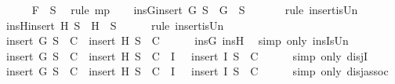 \begin{isabellebody}
\ \ \ \ \isamarkupfalse%
\ {\isacartoucheopen}F\ {\isasymin}\ {\isacharquery}S{\isacartoucheclose}\ \isamarkupfalse%
\ {\isacharparenleft}rule\ mp{\isacharparenright}\isanewline
\ \ \isamarkupfalse%
\ insG{\isacharcolon}{\isachardoublequoteopen}insert\ G\ {\isacharquery}S\ {\isacharequal}\ {\isacharbraceleft}G{\isacharbraceright}\ {\isasymunion}\ {\isacharquery}S{\isachardoublequoteclose}\ \isanewline
\ \ \ \ \isamarkupfalse%
\ {\isacharparenleft}rule\ insert{\isacharunderscore}is{\isacharunderscore}Un{\isacharparenright}\isanewline
\ \ \isamarkupfalse%
\ insH{\isacharcolon}{\isachardoublequoteopen}insert\ H\ {\isacharquery}S\ {\isacharequal}\ {\isacharbraceleft}H{\isacharbraceright}\ {\isasymunion}\ {\isacharquery}S{\isachardoublequoteclose}\isanewline
\ \ \ \ \isamarkupfalse%
\ {\isacharparenleft}rule\ insert{\isacharunderscore}is{\isacharunderscore}Un{\isacharparenright}\isanewline
\ \ \isamarkupfalse%
\ {\isachardoublequoteopen}insert\ G\ {\isacharquery}S\ {\isasymin}\ C\ {\isasymor}\ insert\ H\ {\isacharquery}S\ {\isasymin}\ C{\isachardoublequoteclose}\isanewline
\ \ \ \ \isamarkupfalse%
\ insG\ insH\ \isamarkupfalse%
\ {\isacharparenleft}simp\ only{\isacharcolon}\ insIsUn{\isacharparenright}\isanewline
\ \ \isamarkupfalse%
\ \isamarkupfalse%
\ {\isachardoublequoteopen}{\isacharparenleft}insert\ G\ {\isacharquery}S\ {\isasymin}\ C\ {\isasymor}\ insert\ H\ {\isacharquery}S\ {\isasymin}\ C{\isacharparenright}\ {\isasymor}\ {\isacharparenleft}{\isasymexists}I\ {\isasymin}\ {\isacharbraceleft}{\isacharbraceright}{\isachardot}\ insert\ I\ {\isacharquery}S\ {\isasymin}\ C{\isacharparenright}{\isachardoublequoteclose}\isanewline
\ \ \ \ \isamarkupfalse%
\ {\isacharparenleft}simp\ only{\isacharcolon}\ disjI{}{\isacharparenright}\isanewline
\ \ \isamarkupfalse%
\ \isamarkupfalse%
\ {\isachardoublequoteopen}insert\ G\ {\isacharquery}S\ {\isasymin}\ C\ {\isasymor}\ {\isacharparenleft}insert\ H\ {\isacharquery}S\ {\isasymin}\ C\ {\isasymor}\ {\isacharparenleft}{\isasymexists}I\ {\isasymin}\ {\isacharbraceleft}{\isacharbraceright}{\isachardot}\ insert\ I\ {\isacharquery}S\ {\isasymin}\ C{\isacharparenright}{\isacharparenright}{\isachardoublequoteclose}\isanewline
\ \ \ \ \isamarkupfalse%
\ {\isacharparenleft}simp\ only{\isacharcolon}\ disj{\isacharunderscore}assoc{\isacharparenright}\isanewline
\ \ \isamarkupfalse%

\end{isabellebody}
